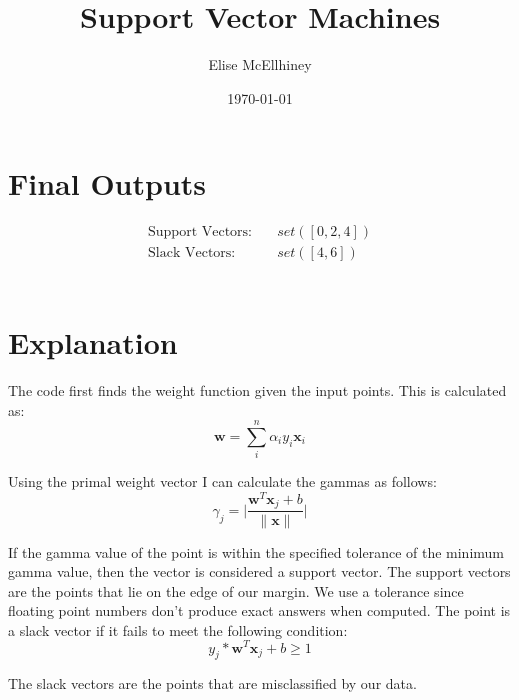 \documentclass[11pt]{amsart}
\title{Support Vector Machines}
\author{Elise McEllhiney}
\date{\today}                                           %
\begin{document}
\maketitle

\section{Final Outputs}
\begin{align}
\text{Support Vectors:} \quad & set([0, 2, 4])\\
\text{Slack Vectors:} \quad & set([4, 6])
\end{align}
\\
\section{Explanation}

The code first finds the weight function given the input points.  This is calculated as:
$$\pmb{w} = \sum_i^n \alpha_i y_i \pmb{x}_i$$

Using the primal weight vector I can calculate the gammas as follows:
$$\gamma_j = \Big\lvert \frac{ \pmb{w}^T \pmb{x}_j + b }{ \lVert \pmb{x} \rVert} \Big\rvert$$

If the gamma value of the point is within the specified tolerance of the minimum gamma value, then the vector is considered a support vector.  The support vectors are the points that lie on the edge of our margin.  We use a tolerance since floating point numbers don't produce exact answers when computed.  The point is a slack vector if it fails to meet the following condition:
$$y_j * \pmb{w}^T \pmb{x}_j + b \geq 1$$

The slack vectors are the points that are misclassified by our data.
\end{document}
